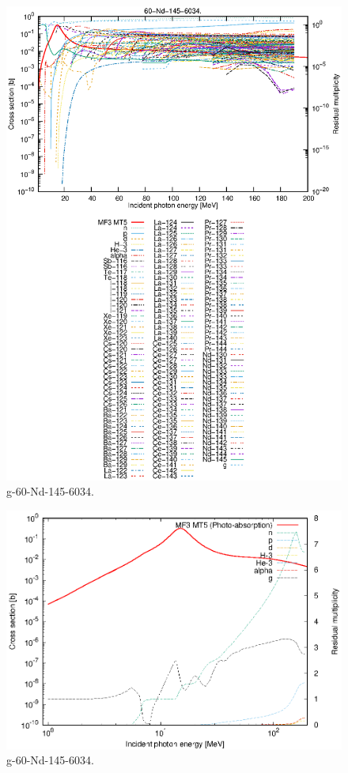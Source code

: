 \begin{figure}
 \includegraphics[width=\linewidth]{eps/g_60-Nd-145_6034.eps}
  \caption{g-60-Nd-145-6034.}
\end{figure}
\newpage \clearpage

\begin{figure}
 \includegraphics[width=\linewidth]{eps-log/g_60-Nd-145_6034.eps}
 \caption{g-60-Nd-145-6034.}
\end{figure}
\newpage \clearpage

